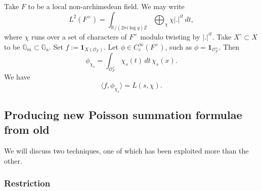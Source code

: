 \documentclass[reqno]{amsart} 
\numberwithin{theorem}{section}
\numberwithin{equation}{section}
\numberwithin{exercise}{section}
\begin{document}
\begin{example}\label{example:cq6ud4pnkj}
  Take $F$ to be a local non-archimedean field.  We may write
  \begin{equation*}
    L^2(F^\times) = \int_{\mathbb{R} / (2 \pi i \log q) \mathbb{Z}} \bigoplus_\chi \chi \lvert . \rvert^{i t} \, d t,
  \end{equation*}
  where $\chi$ runs over a set of characters of $F^\times$ modulo twisting by $\lvert . \rvert^{i t}$.  Take $X^{\circ} \subset X$ to be $\mathbb{G}_m \subset \mathbb{G}_a$.  Set $f := \mathbf{1}_{X(\mathcal{O}_F)}$.  Let $\phi \in C_c^\infty(F^\times)$, such as $\phi = \mathbf{1}_{\mathcal{O}_F^\times}$.  Then
  \begin{equation*}
    \phi_{\chi_s} = \int_{\mathcal{O}_F^\times} \chi_s(t) \, d t \, \chi_s(x).
  \end{equation*}
  We have
  \begin{equation*}
    \langle f, \phi_{\chi_s} \rangle = L(s, \chi).
  \end{equation*}
\end{example}


\subsection{Producing new Poisson summation formulae from old}\label{sec:cq6ud4pku1}

We will discuss two techniques, one of which has been exploited more than the other.

\subsubsection{Restriction}\label{sec:cq6ud4pjsa}
\end{document}
